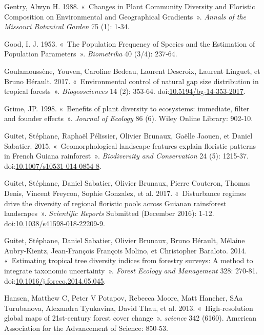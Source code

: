 \documentclass[11pt,french,A4paper,extrafontsizes,onecolumn,openright]{memoir}
\begin{document}
\hypertarget{ref-Gentry1988}{}
Gentry, Alwyn H. 1988. «~Changes in Plant Community Diversity and
Floristic Composition on Environmental and Geographical Gradients~».
\emph{Annals of the Missouri Botanical Garden} 75 (1): 1‑34.

\hypertarget{ref-Good1953}{}
Good, I. J. 1953. «~The Population Frequency of Species and the
Estimation of Population Parameters~». \emph{Biometrika} 40 (3/4):
237‑64.

\hypertarget{ref-Goulamoussene2017}{}
Goulamoussène, Youven, Caroline Bedeau, Laurent Descroix, Laurent
Linguet, et Bruno Hérault. 2017. «~Environmental control of natural gap
size distribution in tropical forests~». \emph{Biogeosciences} 14 (2):
353‑64.
doi:\href{https://doi.org/10.5194/bg-14-353-2017}{10.5194/bg-14-353-2017}.

\hypertarget{ref-Grime1998}{}
Grime, JP. 1998. «~Benefits of plant diversity to ecosystems: immediate,
filter and founder effects~». \emph{Journal of Ecology} 86 (6). Wiley
Online Library: 902‑10.

\hypertarget{ref-Guitet2015}{}
Guitet, Stéphane, Raphaël Pélissier, Olivier Brunaux, Gaëlle Jaouen, et
Daniel Sabatier. 2015. «~Geomorphological landscape features explain
floristic patterns in French Guiana rainforest~». \emph{Biodiversity and
Conservation} 24 (5): 1215‑37.
doi:\href{https://doi.org/10.1007/s10531-014-0854-8}{10.1007/s10531-014-0854-8}.

\hypertarget{ref-Guitet2017}{}
Guitet, Stéphane, Daniel Sabatier, Olivier Brunaux, Pierre Couteron,
Thomas Denis, Vincent Freycon, Sophie Gonzalez, et al. 2017.
«~Disturbance regimes drive the diversity of regional floristic pools
across Guianan rainsforest landscapes~». \emph{Scientific Reports}
Submitted (December 2016): 1‑12.
doi:\href{https://doi.org/10.1038/s41598-018-22209-9}{10.1038/s41598-018-22209-9}.

\hypertarget{ref-Guitet2014}{}
Guitet, Stéphane, Daniel Sabatier, Olivier Brunaux, Bruno Hérault,
Mélaine Aubry-Kientz, Jean-François François Molino, et Christopher
Baraloto. 2014. «~Estimating tropical tree diversity indices from
forestry surveys: A method to integrate taxonomic uncertainty~».
\emph{Forest Ecology and Management} 328: 270‑81.
doi:\href{https://doi.org/10.1016/j.foreco.2014.05.045}{10.1016/j.foreco.2014.05.045}.

\hypertarget{ref-Hansen2013}{}
Hansen, Matthew C, Peter V Potapov, Rebecca Moore, Matt Hancher, SAa
Turubanova, Alexandra Tyukavina, David Thau, et al. 2013.
«~High-resolution global maps of 21st-century forest cover change~».
\emph{science} 342 (6160). American Association for the Advancement of
Science: 850‑53.
\end{document}
